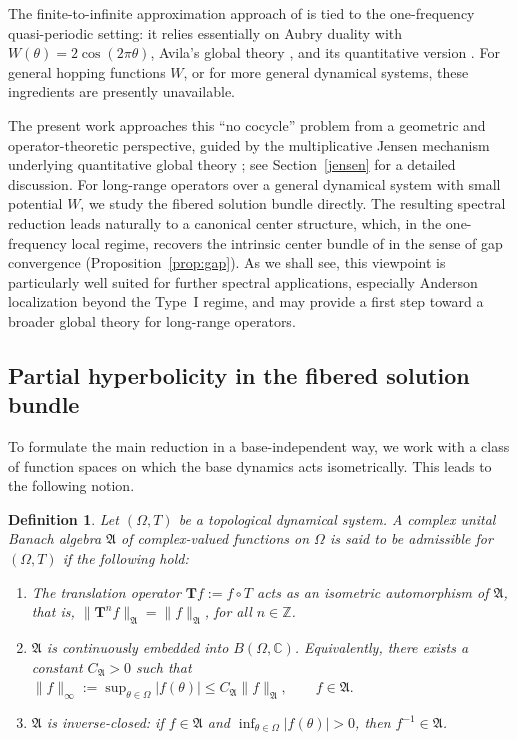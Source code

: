 \documentclass[reqno,11pt]{amsart}
\newtheorem{definition}{Definition}[section]
\begin{document}
The finite-to-infinite approximation approach of \cite{GJ} is  tied to the one-frequency quasi-periodic setting: it relies essentially on Aubry duality with $W(\theta)=2\cos(2\pi\theta)$, Avila's global theory \cite{avila}, and its quantitative version \cite{GJYZ}. For general hopping functions $W$, or for more general dynamical systems, these ingredients are presently unavailable.


The present work approaches this ``no cocycle'' problem from a geometric and operator-theoretic perspective, guided by the multiplicative Jensen mechanism underlying quantitative global theory \cite{GJYZ,HS4}; see Section~\ref{jensen} for a detailed discussion. For long-range operators over a general dynamical system with small potential $W$, we study the fibered solution bundle directly. The resulting spectral reduction leads naturally to a canonical center structure, which, in the one-frequency local regime, recovers the intrinsic center bundle of \cite{GJ} in the sense of gap convergence (Proposition~\ref{prop:gap}). As we shall see, this viewpoint is particularly well suited for further spectral applications, especially Anderson localization beyond the Type~I regime, and may provide a first step toward a broader global theory for long-range operators.








\subsection{Partial hyperbolicity in the fibered solution bundle }\label{def:norm}


To formulate the main reduction in a base-independent way, we work with a class of function spaces on which the base dynamics acts isometrically. This leads to the following notion.
\begin{definition}\label{def:admissible}
Let $(\Omega,T)$ be a topological dynamical system. A complex unital Banach algebra $\mathfrak A$ of complex-valued functions on $\Omega$ is said to be \emph{admissible for $(\Omega,T)$} if the following hold:
\begin{enumerate}
    \item The translation operator $\mathbf T f:=f\circ T$ acts as an isometric automorphism of $\mathfrak A$, that is,
   $ \|\mathbf T^n f\|_{\mathfrak A}=\|f\|_{\mathfrak A} $, for all $ n\in\mathbb Z
$.
    \item $\mathfrak A$ is continuously embedded into $B(\Omega,\mathbb C)$. Equivalently, there exists a constant $C_{\mathfrak A}>0$ such that
$    \|f\|_\infty:=\sup_{\theta\in\Omega}|f(\theta)|\le C_{\mathfrak A}\|f\|_{\mathfrak A},\qquad f\in\mathfrak A.$
    \item $\mathfrak A$ is inverse-closed: if $f\in\mathfrak A$ and $\inf_{\theta\in\Omega}|f(\theta)|>0$, then $f^{-1}\in\mathfrak A$.
\end{enumerate}
\end{definition}
\end{document}
